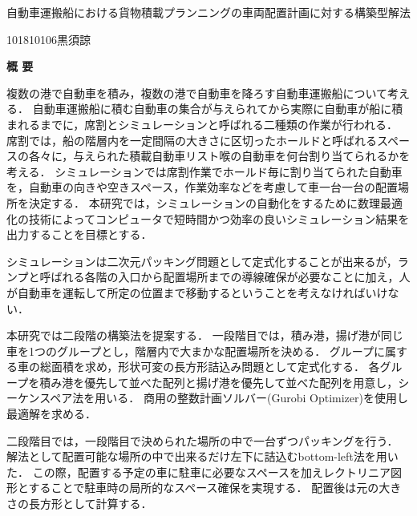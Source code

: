 \begin{center}
{\LARGE 自動車運搬船における貨物積載プランニングの車両配置計画に対する構築型解法}\\[0.5cm]
\end{center}
\hfill
{\large 101810106\qquad 黒須諒}\\[0.5cm]
\begin{center}
{\Large \bf 概 要}\\
\end{center}

複数の港で自動車を積み，複数の港で自動車を降ろす自動車運搬船について考える．
自動車運搬船に積む自動車の集合が与えられてから実際に自動車が船に積まれるまでに，席割とシミュレーションと呼ばれる二種類の作業が行われる．
席割では，船の階層内を一定間隔の大きさに区切ったホールドと呼ばれるスペースの各々に，与えられた積載自動車リスト喉の自動車を何台割り当てられるかを考える．
シミュレーションでは席割作業でホールド毎に割り当てられた自動車を，自動車の向きや空きスペース，作業効率などを考慮して車一台一台の配置場所を決定する．
本研究では，シミュレーションの自動化をするために数理最適化の技術によってコンピュータで短時間かつ効率の良いシミュレーション結果を出力することを目標とする．

シミュレーションは二次元パッキング問題として定式化することが出来るが，ランプと呼ばれる各階の入口から配置場所までの導線確保が必要なことに加え，人が自動車を運転して所定の位置まで移動するということを考えなければいけない．

本研究では二段階の構築法を提案する．
一段階目では，積み港，揚げ港が同じ車を1つのグループとし，階層内で大まかな配置場所を決める．
グループに属する車の総面積を求め，形状可変の長方形詰込み問題として定式化する．
各グループを積み港を優先して並べた配列と揚げ港を優先して並べた配列を用意し，シーケンスペア法を用いる．
商用の整数計画ソルバー(Gurobi Optimizer)を使用し最適解を求める．

二段階目では，一段階目で決められた場所の中で一台ずつパッキングを行う．
解法として配置可能な場所の中で出来るだけ左下に詰込むbottom-left法を用いた．
この際，配置する予定の車に駐車に必要なスペースを加えレクトリニア図形とすることで駐車時の局所的なスペース確保を実現する．
配置後は元の大きさの長方形として計算する．




